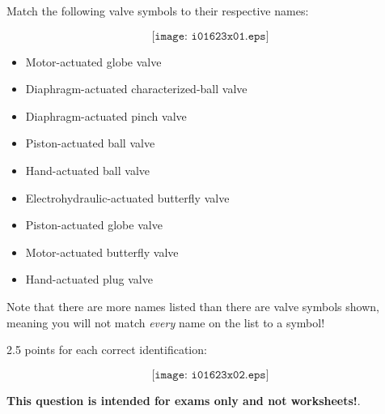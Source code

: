 

Match the following valve symbols to their respective names:

$$\texttt{[image: i01623x01.eps]}$$

\begin{itemize}
\item{} Motor-actuated globe valve
\item{} Diaphragm-actuated characterized-ball valve
\item{} Diaphragm-actuated pinch valve
\item{} Piston-actuated ball valve
\item{} Hand-actuated ball valve
\item{} Electrohydraulic-actuated butterfly valve
\item{} Piston-actuated globe valve
\item{} Motor-actuated butterfly valve
\item{} Hand-actuated plug valve
\end{itemize}

Note that there are more names listed than there are valve symbols shown, meaning you will not match {\it every} name on the list to a symbol!







2.5 points for each correct identification:

$$\texttt{[image: i01623x02.eps]}$$







{\bf This question is intended for exams only and not worksheets!}.



